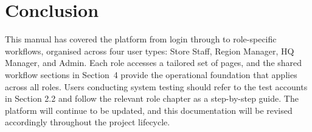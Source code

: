 \documentclass[11pt,a4paper]{article}
\begin{document}
\section*{Conclusion}
This manual has covered the platform from login through to role-specific workflows, organised across four user types: Store Staff, Region Manager, HQ Manager, and Admin. Each role accesses a tailored set of pages, and the shared workflow sections in Section~4 provide the operational foundation that applies across all roles. Users conducting system testing should refer to the test accounts in Section 2.2 and follow the relevant role chapter as a step-by-step guide. The platform will continue to be updated, and this documentation will be revised accordingly throughout the project lifecycle.



\end{document}
